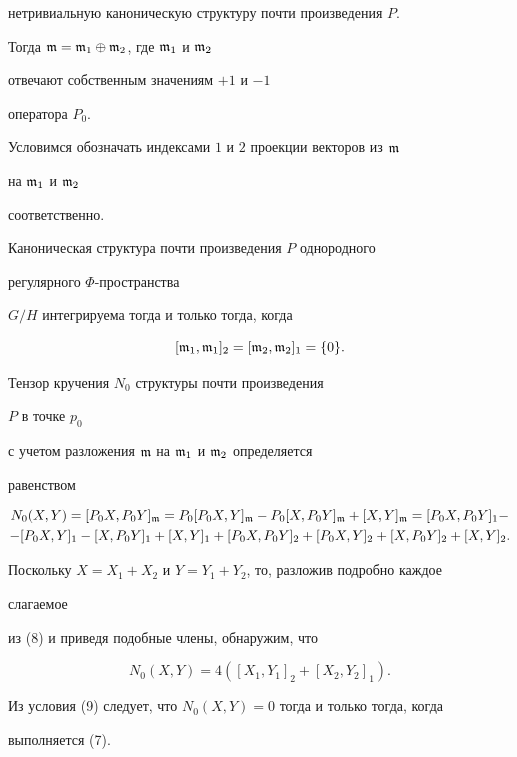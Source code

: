 нетривиальную каноническую структуру почти произведения $P$. 


Тогда $\frak m=\frak m_1\oplus\frak m_2$, где $\frak m_1$ и $\frak m_2$ 


отвечают собственным значениям $+1$ и $-1$ 


оператора $P_0$. 


Условимся обозначать индексами $1$ и $2$ проекции векторов из $\frak m$ 


на $\frak m_1$ и $\frak m_2$ 


соответственно. 


 


\begin{thm}


Каноническая структура почти произведения $P$ однородного 


регулярного $\Phi$-пространства 


$G/H$ интегрируема тогда и только тогда, когда 


\begin{equation} 


[\frak m_1,\frak m_1]_2=[\frak m_2,\frak m_2]_1=\{0\}. 


\end{equation} 


\end{thm} 


 


\begin{pf} Тензор кручения $N_0$ структуры почти произведения 


$P$ в точке $p_0$ 


с учетом разложения $\frak m$ на $\frak m_1$ и $\frak m_2$ определяется 


равенством 


\begin{multline} 


N_0(X,Y)=[P_0X,P_0Y]_{\frak m}=P_0[P_0X,Y]_{\frak m}- 


P_0[X,P_0Y]_{\frak m}+[X,Y]_{\frak m}=[P_0X,P_0Y]_1 - \\ 


%


-[P_0X,Y]_1-[X,P_0Y]_1+[X,Y]_1+[P_0X,P_0Y]_2+ 


[P_0X,Y]_2+[X,P_0Y]_2+[X,Y]_2. 


\end{multline} 


Поскольку $X=X_1+X_2$ и $Y=Y_1+Y_2$, то, разложив подробно каждое 


слагаемое 


из (8) и приведя подобные члены, обнаружим, что 


\begin{equation} 


N_0(X,Y)=4([X_1,Y_1]_2+[X_2,Y_2]_1). 


\end{equation} 


Из условия (9) следует, что $N_0(X,Y)=0$ тогда и только тогда, когда 


выполняется (7). 


\end{pf} 



